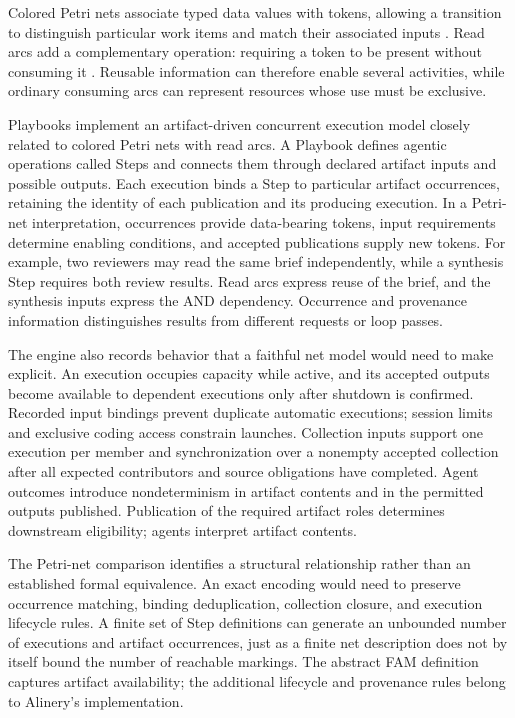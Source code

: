 \documentclass[letterpaper]{article}
\theoremstyle{definition}
\begin{document}
Colored Petri nets associate typed data values with tokens, allowing a
transition to distinguish particular work items and match their associated
inputs \cite{jensen1994coloured}. Read arcs add a complementary operation:
requiring a token to be present without consuming it
\cite{rodriguez2012readarcs}. Reusable information can therefore enable several
activities, while ordinary consuming arcs can represent resources whose use
must be exclusive.

Playbooks implement an artifact-driven concurrent execution model closely
related to colored Petri nets with read arcs. A Playbook defines agentic
operations called Steps and connects them through declared artifact inputs and
possible outputs. Each execution binds a Step to particular artifact
occurrences, retaining the identity of each publication and its producing
execution. In a Petri-net interpretation, occurrences provide data-bearing
tokens, input requirements determine enabling conditions, and accepted
publications supply new tokens. For example, two reviewers may read the same
brief independently, while a synthesis Step requires both review results.
Read arcs express reuse of the brief, and the synthesis inputs express the
AND dependency. Occurrence and provenance information distinguishes results
from different requests or loop passes.

The engine also records behavior that a faithful net model would need to make
explicit. An execution occupies capacity while active, and its accepted
outputs become available to dependent executions only after shutdown is
confirmed. Recorded input bindings prevent duplicate automatic executions;
session limits and exclusive coding access constrain launches. Collection
inputs support one execution per member and synchronization over a nonempty
accepted collection after all expected contributors and source obligations
have completed. Agent outcomes introduce nondeterminism in artifact contents
and in the permitted outputs published. Publication of the required artifact
roles determines downstream eligibility; agents interpret artifact contents.

The Petri-net comparison identifies a structural relationship rather than an
established formal equivalence. An exact encoding would need to preserve
occurrence matching, binding deduplication, collection closure, and execution
lifecycle rules. A finite set of Step definitions can generate an unbounded
number of executions and artifact occurrences, just as a finite net description
does not by itself bound the number of reachable markings. The abstract FAM
definition captures artifact availability; the additional lifecycle and
provenance rules belong to Alinery's implementation.
\end{document}
